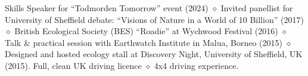 \begin{rubric}{Skills}
	Speaker for ``Todmorden Tomorrow'' event (2024) $\diamond$ Invited panellist for University of Sheffield debate: ``Visions of Nature in a World of 10 Billion'' (2017) $\diamond$ British Ecological Society (BES) ``Roadie'' at Wychwood Festival (2016) $\diamond$ Talk \& practical session with Earthwatch Institute in Malua, Borneo (2015) $\diamond$ Designed and hosted ecology stall at Discovery Night, University of Sheffield, UK (2015).
\entry*[Driving]
	Full, clean UK driving licence $\diamond$ 4x4 driving experience.
\end{rubric}
